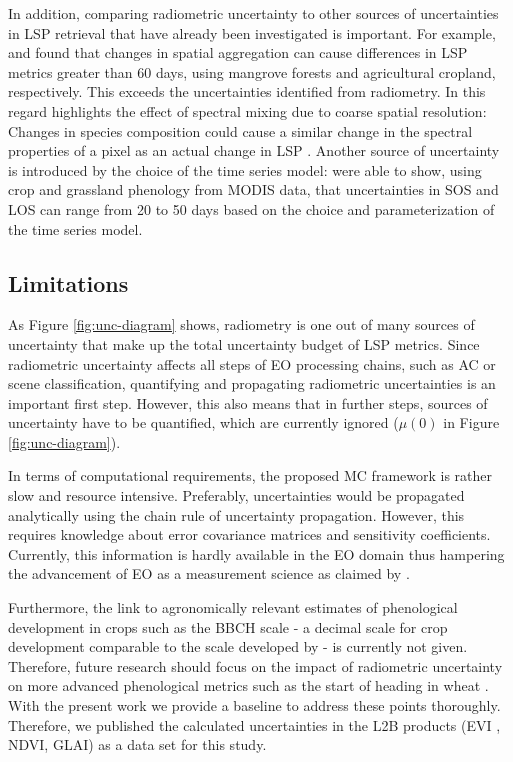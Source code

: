 In addition, comparing radiometric uncertainty to other sources of uncertainties in \gls{LSP} retrieval that have already been investigated is important. For example, \cite{younes_all_2021} and \cite{van_bussel_effects_2011} found that changes in spatial aggregation can cause differences in \gls{LSP} metrics greater than 60 days, using mangrove forests and agricultural cropland, respectively. This exceeds the uncertainties identified from radiometry. In this regard \cite{helman_land_2018} highlights the effect of spectral mixing due to coarse spatial resolution: Changes in species composition could cause a similar change in the spectral properties of a pixel as an actual change in \gls{LSP} \citep{chen_mixed_2018}. Another source of uncertainty is introduced by the choice of the time series model: \cite{lara_assessing_2016} were able to show, using crop and grassland phenology from MODIS data, that uncertainties in \gls{SOS} and \gls{LOS} can range from 20 to 50 days based on the choice and parameterization of the time series model.

\subsection{Limitations}
\label{subsec:limitations}

As Figure \ref{fig:unc-diagram} shows, radiometry is one out of many sources of uncertainty that make up the total uncertainty budget of \gls{LSP} metrics. Since radiometric uncertainty affects all steps of \gls{EO} processing chains, such as AC or scene classification, quantifying and propagating radiometric uncertainties is an important first step. However, this also means that in further steps, sources of uncertainty have to be quantified, which are currently ignored ($\mu(0)$ in Figure \ref{fig:unc-diagram}). 

In terms of computational requirements, the proposed  \gls{MC} framework is rather slow and resource intensive. Preferably, uncertainties would be propagated analytically using the chain rule of uncertainty propagation. However, this requires knowledge about error covariance matrices and sensitivity coefficients. Currently, this information is hardly available in the \gls{EO} domain thus hampering the advancement of \gls{EO} as a measurement science as claimed by \cite{mittaz_applying_2019}.

Furthermore, the link to agronomically relevant estimates of phenological development in crops such as the BBCH scale - a decimal scale for crop development comparable to the scale developed by \cite{zadoks_decimal_1974} - is currently not given. Therefore, future research should focus on the impact of radiometric uncertainty on more advanced phenological metrics such as the start of heading in wheat \citep{harfenmeister_detecting_2021}. With the present work we provide a baseline to address these points thoroughly. Therefore, we published the calculated uncertainties in the L2B products (\gls{EVI} , NDVI, GLAI) as a data set for this study.

